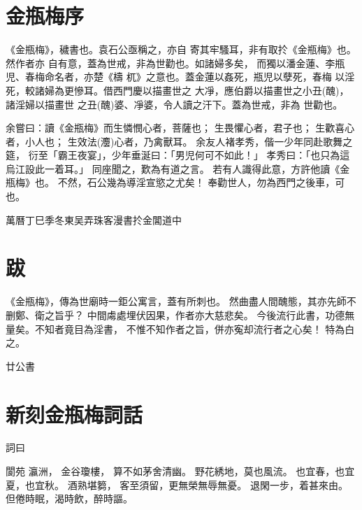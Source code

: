 \begin{showcontents}{}
\chapter*{金瓶梅序}

《金瓶梅》，穢書也。袁石公亟稱之，亦自
寄其牢騷耳，非有取扵《金瓶梅》也。然作者亦
自有意，蓋為世戒，非為世勸也。如諸婦多矣，
而獨以潘金蓮、李瓶児、春梅命名者，亦楚《檮
杌》之意也。蓋金蓮以姦死，瓶児以孽死，春梅
以淫死，較諸婦為更慘耳。借西門慶以描畫世之
大凈，應伯爵以描畫世之小丑(醜)，諸淫婦以描畫世
之丑(醜)婆、凈婆，令人讀之汗下。蓋為世戒，非為
世勸也。

余嘗曰：讀《金瓶梅》而生憐憫心者，菩薩也；
生畏懼心者，君子也；
生歡喜心者，小人也；
生效法(灋)心者，乃禽獸耳。
余友人褚孝秀，偕一少年同赴歌舞之筵，
衍至「霸王夜宴」，少年垂涎曰：「男児何可不如此！」
孝秀曰：「也只為這烏江設此一着耳。」
同座聞之，歎為有道之言。
若有人識得此意，方許他讀《金瓶梅》也。
不然，石公幾為導淫宣慾之尤矣！
奉勸世人，勿為西門之後車，可也。

{\bigskip\mbox{}\fzqiti\large\hfill 萬曆丁巳季冬東吴弄珠客漫書扵金閶道中 \quad}







\chapter*{跋}

《金瓶梅》，傳為世廟時一鉅公寓言，蓋有所刺也。
然曲盡人間醜態，其亦先師不删鄭、衛之旨乎？
中間䖏處埋伏因果，作者亦大慈悲矣。
今後流行此書，功德無量矣。不知者竟目為淫書，
不惟不知作者之旨，併亦寃却流行者之心矣！
特為白之。

{\bigskip\mbox{}\fzqiti\large\hfill 廿公書 \quad}





\chapter*{新刻金瓶梅詞話}

詞曰

閬苑
瀛洲，
金谷瓊樓， 算不如茅舍清幽。
野花綉地，莫也風流。
也宜春，也宜夏，也宜秋。
酒熟堪篘，%
客至須留，更無榮無辱無憂。
退閑一步，着甚來由。
但倦時眠，渴時飲，醉時謳。


\end{showcontents}
